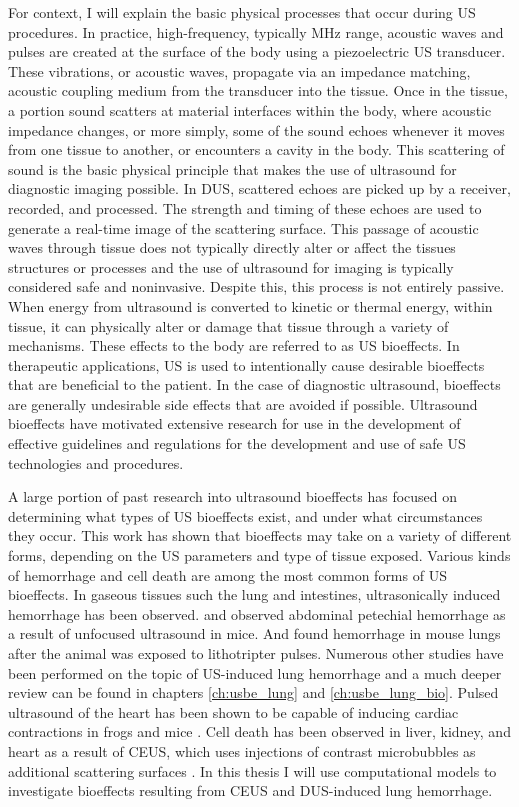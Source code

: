 For context, I will explain the basic physical processes that occur
during \ac{US} procedures. In practice, high-frequency, typically MHz
range, acoustic waves and pulses are created at the surface of the
body using a piezoelectric \ac{US} transducer. These vibrations, or
acoustic waves, propagate via an impedance matching, acoustic coupling
medium from the transducer into the tissue. Once in the tissue, a
portion sound scatters at material interfaces within the body, where
acoustic impedance changes, or more simply, some of the sound echoes
whenever it moves from one tissue to another, or encounters a cavity
in the body. This scattering of sound is the basic physical principle
that makes the use of ultrasound for diagnostic imaging possible. In
\ac{DUS}, scattered echoes are picked up by a receiver, recorded, and
processed. The strength and timing of these echoes are used to
generate a real-time image of the scattering surface. This passage of
acoustic waves through tissue does not typically directly alter or
affect the tissues structures or processes and the use of ultrasound
for imaging is typically considered safe and noninvasive. Despite
this, this process is not entirely passive. When energy from
ultrasound is converted to kinetic or thermal energy, within tissue,
it can physically alter or damage that tissue through a variety of
mechanisms. These effects to the body are referred to as \ac{US}
bioeffects. In therapeutic applications, \ac{US} is used to
intentionally cause desirable bioeffects that are beneficial to the
patient. In the case of diagnostic ultrasound, bioeffects are
generally undesirable side effects that are avoided if
possible. Ultrasound bioeffects have motivated extensive research for
use in the development of effective guidelines and regulations for the
development and use of safe \ac{US} technologies and
procedures. 

A large portion of past research into ultrasound bioeffects has
focused on determining what types of \ac{US} bioeffects exist, and
under what circumstances they occur. This work has shown that
bioeffects may take on a variety of different forms, depending on the
\ac{US} parameters and type of tissue exposed. Various kinds of
hemorrhage and cell death are among the most common forms of \ac{US}
bioeffects. In gaseous tissues such the lung and intestines,
ultrasonically induced hemorrhage has been
observed. \cite{Lehmann1953} and \cite{Miller1994} observed abdominal
petechial hemorrhage as a result of unfocused ultrasound in mice. And
\cite{Child1990} found hemorrhage in mouse lungs after the animal was
exposed to lithotripter pulses. Numerous other studies have been
performed on the topic of US-induced lung hemorrhage and a much deeper
review can be found in chapters \ref{ch:usbe_lung} and
\ref{ch:usbe_lung_bio}. Pulsed ultrasound of the heart has been shown
to be capable of inducing cardiac contractions in frogs and mice
\citep{Dalecki1993,MacRobbie1997}. Cell death has been observed in
liver, kidney, and heart as a result of \ac{CEUS}, which uses
injections of contrast microbubbles as additional scattering surfaces
\cite{Skyba1998, Miller2008a}. In this thesis I will use computational
models to investigate bioeffects resulting from \ac{CEUS} and
\ac{DUS}-induced lung hemorrhage.

